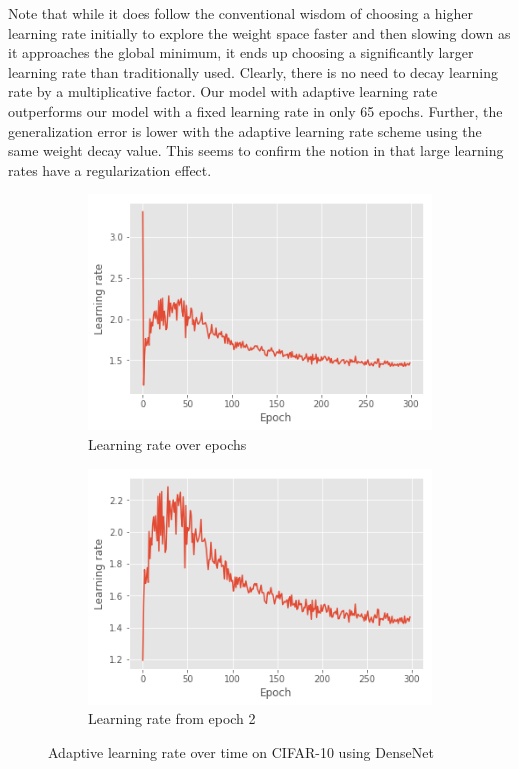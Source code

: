 \documentclass{article}
\begin{document}
Note that while it does follow the conventional wisdom of choosing a higher learning rate initially to explore the weight space faster and then slowing down as it approaches the global minimum, it ends up choosing a significantly larger learning rate than traditionally used. Clearly, there is no need to decay learning rate by a multiplicative factor. Our model with adaptive learning rate outperforms our model with a fixed learning rate in only 65 epochs. Further, the generalization error is lower with the adaptive learning rate scheme using the same weight decay value. This seems to confirm the notion in \cite{smith2017super} that large learning rates have a regularization effect.

\begin{figure}
    \centering
    \begin{subfigure}[b]{0.4\textwidth}
        \includegraphics[width=\linewidth]{cifar10-dn-lr-full.png}
        \caption{Learning rate over epochs}
        \label{fig:cifar10:4a}
    \end{subfigure}
    \begin{subfigure}[b]{0.4\textwidth}
        \includegraphics[width=\linewidth]{cifar10-dn-adaptive-lr.png}
        \caption{Learning rate from epoch 2}
        \label{fig:cifar10:4b}
    \end{subfigure}
    \caption{Adaptive learning rate over time on CIFAR-10 using DenseNet}
    \label{fig:cifar10:4}
\end{figure}
\end{document}
